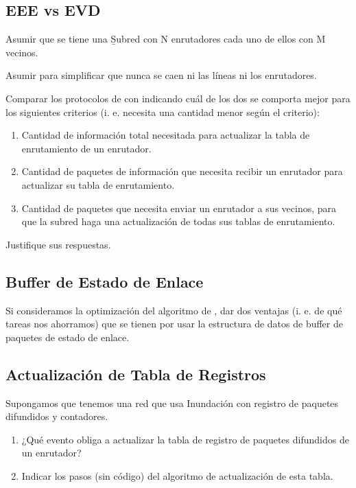 \documentclass[12pt]{report}
\begin{document}
\begin{exer}
	\subsection{EEE vs EVD \sthree}
	Asumir que se tiene una \b{Subred con N enrutadores cada uno de ellos con M vecinos}.

	Asumir para simplificar que nunca se caen ni las líneas ni los enrutadores.

	Comparar los protocolos de  con  indicando cuál de los dos se comporta mejor para los siguientes criterios (i. e. necesita
	una cantidad menor según el criterio):

	\begin{enumerate}
		\item Cantidad de información total necesitada para actualizar la tabla de enrutamiento de un
		      enrutador.
		\item Cantidad de paquetes de información que necesita recibir un enrutador para actualizar
		      su tabla de enrutamiento.
		\item Cantidad de paquetes que necesita enviar un enrutador a sus vecinos, para que la subred
		      haga una actualización de todas sus tablas de enrutamiento.
	\end{enumerate}

	Justifique sus respuestas.
\end{exer}

\begin{exer}
	\subsection{Buffer de Estado de Enlace \stwo \steo}
	Si consideramos la optimización del algoritmo de , dar dos ventajas (i. e. de qué tareas nos ahorramos) que se tienen por usar la estructura de datos de buffer de paquetes de estado de enlace.
\end{exer}

\begin{exer}
	\subsection{Actualización de Tabla de Registros \stwo \steo}
	Supongamos que tenemos una red que usa Inundación con registro de paquetes difundidos y contadores.

	\begin{enumerate}
		\item ¿Qué evento obliga a actualizar la tabla de registro de paquetes difundidos de un enrutador?
		\item Indicar los pasos (sin código) del algoritmo de actualización de esta tabla.
	\end{enumerate}
\end{exer}
\end{document}
